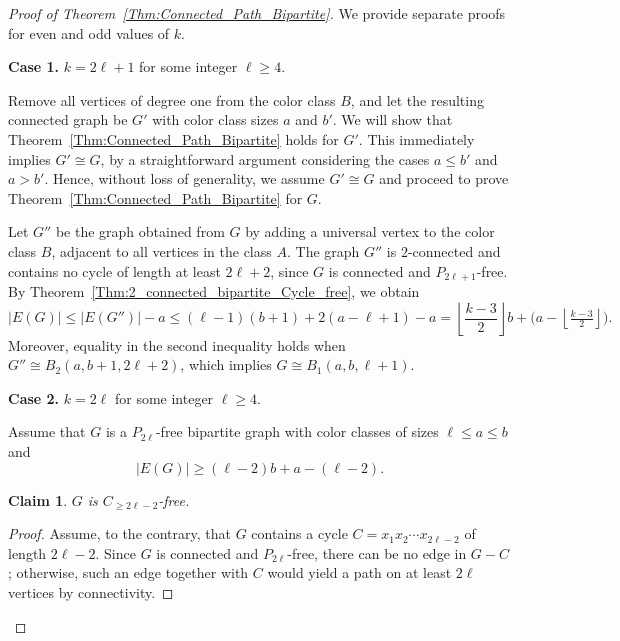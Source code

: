 \documentclass[11pt,a4paper]{article}
\newtheorem{claim}{Claim}
\begin{document}
\begin{proof}[Proof of Theorem~\ref{Thm:Connected_Path_Bipartite}]
We provide separate proofs for even and odd values of $k$.

\textbf{Case 1.}  $k = 2\ell + 1$ for some integer $\ell \ge 4$.

Remove all vertices of degree one from the color class $B$, and let the resulting connected graph be $G'$ with color class sizes $a$ and $b'$.  
We will show that Theorem~\ref{Thm:Connected_Path_Bipartite} holds for $G'$.  
This immediately implies $G' \cong G$, by a straightforward argument considering the cases $a \le b'$ and $a > b'$.  
Hence, without loss of generality, we assume $G' \cong G$ and proceed to prove Theorem~\ref{Thm:Connected_Path_Bipartite} for $G$.

Let $G''$ be the graph obtained from $G$ by adding a universal vertex to the color class $B$, adjacent to all vertices in the class $A$.  
The graph $G''$ is $2$-connected and contains no cycle of length at least $2\ell + 2$, since $G$ is connected and $P_{2\ell+1}$-free.  
By Theorem~\ref{Thm:2_connected_bipartite_Cycle_free}, we obtain
\[
|E(G)| \le |E(G'')| - a 
      \le (\ell - 1)(b + 1) + 2(a - \ell + 1) - a 
      =\left\lfloor \frac{k - 3}{2} \right\rfloor b + \bigl(a - \left\lfloor \tfrac{k - 3}{2} \right\rfloor \bigr).
\]
Moreover, equality in the second inequality holds when 
$G'' \cong B_2(a, b + 1, 2\ell + 2)$, 
which implies $G \cong B_1(a, b, \ell + 1)$.













\textbf{Case 2.} $k = 2\ell$ for some integer $\ell \ge 4$. 

Assume that $G$ is a $P_{2\ell}$-free bipartite graph with color classes of sizes $\ell \le a \le b$ and 
\[
|E(G)| \ge (\ell - 2)b + a - (\ell - 2).
\]
 

\begin{claim}\label{claim:2l-2-free}
$G$ is $C_{\ge 2\ell-2}$-free.
\end{claim} 
\begin{proof}
Assume, to the contrary, that $G$ contains a cycle $C = x_1x_2\cdots x_{2\ell-2}$ of length $2\ell - 2$.  
Since $G$ is connected and $P_{2\ell}$-free, there can be no edge in $G - C$; otherwise, such an edge together with $C$ would yield a path on at least $2\ell$ vertices by connectivity.  


\end{proof}
\end{proof}
\end{document}
